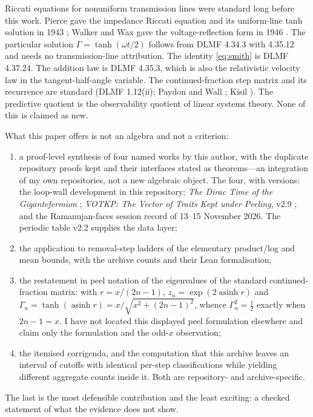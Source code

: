 \documentclass[11pt]{article}
\newcommand{\G}{\Gamma}
\renewcommand{\_}{\origunderscore\allowbreak}
\begin{document}
Riccati equations for nonuniform transmission lines were standard long before this work. Pierce
gave the impedance Riccati equation and its uniform-line tanh solution in 1943 \cite{pierce};
Walker and Wax gave the voltage-reflection form in 1946 \cite{walkerwax}. The particular solution
$\G=\tanh(\omega t/2)$ follows from DLMF 4.34.3 with 4.35.12 \cite{dlmf} and needs no
transmission-line attribution. The identity \eqref{eq:smith} is DLMF 4.37.24. The addition law is
DLMF 4.35.3, which is also the relativistic velocity law in the tangent-half-angle variable. The
continued-fraction step matrix and its recurrence are standard (DLMF 1.12(ii); Paydon and Wall
\cite{paydonwall}; Kisil \cite{kisil}). The predictive quotient is the observability quotient of
linear systems theory. None of this is claimed as new.

What this paper offers is not an algebra and not a criterion:
\begin{enumerate}[label=(\roman*)]
\item a proof-level synthesis of four named works by this author, with the duplicate repository
  proofs kept and their interfaces stated as theorems---an integration of my own repositories, not
  a new algebraic object. The four, with versions: the loop-wall development in this repository;
  \emph{The Dirac Time of the Gigantefermion} \cite{dirac}; \emph{VOTKP: The Vector of Traits Kept
  under Peeling}, v2.9 \cite{votkp}; and the Ramanujan-faces session record of 13--15 November
  2026. The periodic table v2.2 supplies the data layer;
\item the application to removal-step ladders of the elementary product/log and mean bounds, with
  the archive counts and their Lean formalisation;
\item the restatement in peel notation of the eigenvalues of the standard continued-fraction
  matrix: with $r=x/(2n-1)$, $z_n=\exp(2\operatorname{asinh}r)$ and
  $\G_n=\tanh(\operatorname{asinh}r)=x/\sqrt{x^2+(2n-1)^2}$, whence $\G_n^2=\tfrac12$ exactly when
  $2n-1=x$. I have not located this displayed peel formulation elsewhere and claim only the
  formulation and the odd-$x$ observation;
\item the itemised corrigenda, and the computation that this archive leaves an interval of cutoffs
  with identical per-step classifications while yielding different aggregate counts inside it.
  Both are repository- and archive-specific.
\end{enumerate}
The last is the most defensible contribution and the least exciting: a checked statement of what
the evidence does not show.
\end{document}
